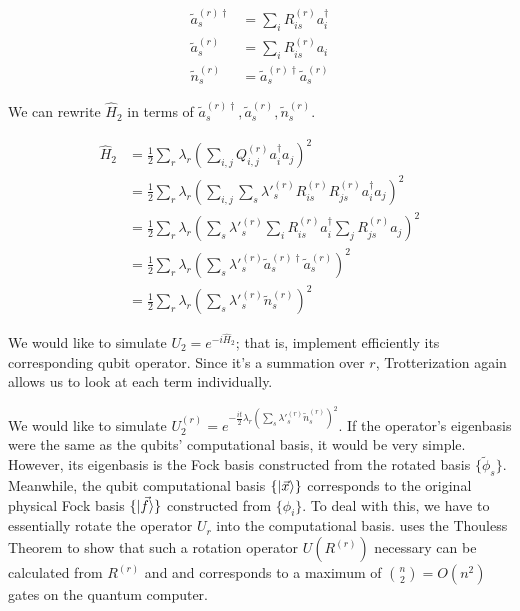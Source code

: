 \begin{equation}
    \begin{split}
        \tilde{a}^{(r)\dag}_s &= \sum_iR^{(r)}_{is}a^\dag_i \\
        \tilde{a}^{(r)}_s &= \sum_iR^{(r)}_{is}a_i \\
        \tilde{n}^{(r)}_s &= \tilde{a}^{(r)\dag}_s\tilde{a}^{(r)}_s
    \end{split}
\end{equation}

We can rewrite $\hat{H}_2$ in terms of $\tilde{a}^{(r)\dag}_s, \tilde{a}^{(r)}_s, \tilde{n}^{(r)}_s$.

\begin{equation}
    \begin{split}
        \hat{H}_2 &= \frac{1}{2}\sum_r\lambda_r(\sum_{i,j} Q^{(r)}_{i, j}a^\dag_ia_j)^2 \\
        &= \frac{1}{2}\sum_r\lambda_r(\sum_{i,j} \sum_s \lambda'^{(r)}_s R^{(r)}_{is}R^{(r)}_{js}a^\dag_ia_j)^2 \\
        &= \frac{1}{2}\sum_r\lambda_r(\sum_s \lambda'^{(r)}_s \sum_i R^{(r)}_{is}a^\dag_i\sum_jR^{(r)}_{js}a_j)^2 \\
        &= \frac{1}{2}\sum_r\lambda_r(\sum_s \lambda'^{(r)}_s \tilde{a}^{(r)\dag}_s\tilde{a}^{(r)}_s)^2 \\
        &= \frac{1}{2}\sum_r\lambda_r(\sum_s \lambda'^{(r)}_s \tilde{n}^{(r)}_s)^2
    \end{split}
\end{equation}

We would like to simulate $U_2 = e^{-i\hat{H}_2}$; that is, implement efficiently its corresponding qubit operator. Since it's a summation over $r$, Trotterization again allows us to look at each term individually.

We would like to simulate $U_2^{(r)} = e^{-\frac{it}{2}\lambda_r(\sum_s \lambda'^{(r)}_s \tilde{n}^{(r)}_s)^2}$. If the operator's eigenbasis were the same as the qubits' computational basis, it would be very simple. However, its eigenbasis is the Fock basis constructed from the rotated basis $\{\tilde{\phi}_s\}$. Meanwhile, the qubit computational basis $\{\ket{\vec{x}}\}$ corresponds to the original physical Fock basis $\{\ket{\vec{f}}\}$ constructed from $\{\phi_i\}$. To deal with this, we have to essentially rotate the operator $U_r$ into the computational basis. \cite{FSN} uses the Thouless Theorem to show that such a rotation operator $U(R^{(r)})$ necessary can be calculated from $R^{(r)}$ and and corresponds to a maximum of ${n \choose 2} = O(n^2)$ gates on the quantum computer. 

